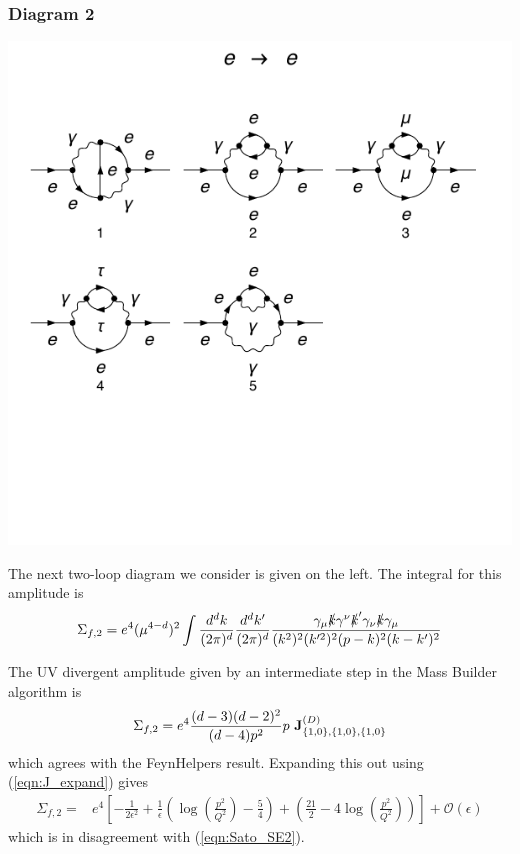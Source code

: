 \documentclass[11pt]{article}
\newcommand{\mb}{\textsf{Mass Builder} }
\begin{document}
\subsubsection{Diagram 2}
\noindent\begin{minipage}{0.3\textwidth}
\begin{center}
\includegraphics{QED_F_2loop_3.pdf}
\end{center}
\end{minipage}
\noindent\begin{minipage}{0.7\textwidth}

The next two-loop diagram we consider is given on the left.  The integral for this amplitude is
\begin{align}
\Sigma_{f,2} = e^4 (\mu^{4-d})^2 \int \frac{d^dk}{(2\pi)^d}  \frac{d^dk'}{(2\pi)^d} \frac{ \gamma_{\mu}\slashed{k}\gamma^{\nu}\slashed{k}'\gamma_{\nu}\slashed{k}\gamma_{\mu}} { (k^2)^2(k'^2)^2(p-k)^2(k-k')^2}
\end{align}
\end{minipage}
The UV divergent amplitude given by an intermediate step in the \mb algorithm is
\begin{align}
\Sigma_{f,2} = e^4 \frac{(d-3)(d-2)^2}{(d-4)p^2} p \ \bold{J}_{ \{1,0\}, \{1,0\}, \{1,0\}}^{(D)}
\end{align}
which agrees with the FeynHelpers result.  Expanding this out using (\ref{eqn:J_expand}) gives
\begin{align}
\Sigma_{f,2} = &e^4 \left[ -\frac{1}{2\epsilon^2} + \frac{1}{\epsilon}\left(\log\left(\frac{p^2}{Q^2}\right)-\frac{5}{4}\right) + \left( \frac{21}{2}-4\log\left(\frac{p^2}{Q^2}\right)\right) \right] + \mathcal{O}(\epsilon)
\end{align}
which is in disagreement with (\ref{eqn:Sato_SE2}).\\
\end{document}
